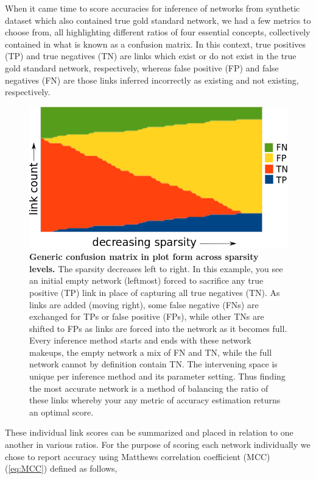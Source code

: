 When it came time to score accuracies for inference of networks from synthetic dataset which also contained true gold standard network, we had a few metrics to choose from, all highlighting different ratios of four essential concepts, collectively contained in what is known as a confusion matrix. In this context, true positives (TP) and true negatives (TN) are links which exist or do not exist in the true gold standard network, respectively, whereas false positive (FP) and false negatives (FN) are those links inferred incorrectly as existing and not existing, respectively.

\begin{figure}
\centering
\includegraphics[width=1\linewidth]{4/confusionMatrix_sparsity.png}
\caption{\textbf{Generic confusion matrix in plot form across sparsity levels.} The sparsity decreases left to right. In this example, you see an initial empty network (leftmost) forced to sacrifice any true positive (TP) link in place of capturing all true negatives (TN). As links are added (moving right), some false negative (FNs) are exchanged for TPs or false positive (FPs), while other TNs are shifted to FPs as links are forced into the network as it becomes full. Every inference method starts and ends with these network makeups, the empty network a mix of FN and TN, while the full network cannot by definition contain TN. The intervening space is unique per inference method and its parameter setting. Thus finding the most accurate network is a method of balancing the ratio of these links whereby your any metric of accuracy estimation returns an optimal score.}
\label{fig:confusion}
\end{figure}

These individual link scores can be summarized and placed in relation to one another in various ratios. For the purpose of scoring each network individually we chose to report accuracy using Matthews correlation coefficient (MCC) (\cref{eq:MCC}) defined as follows,

